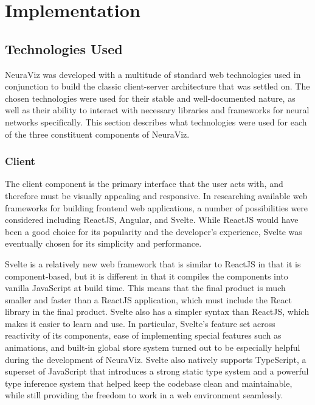 \section{Implementation}
\label{sec:Implementation}

\subsection{Technologies Used}
NeuraViz was developed with a multitude of standard web technologies used in conjunction to build the classic client-server architecture that was settled on. The chosen technologies were used for their stable and well-documented nature, as well as their ability to interact with necessary libraries and frameworks for neural networks specifically.  This section describes what technologies were used for each of the three constituent components of NeuraViz.

\subsubsection{Client}
The client component is the primary interface that the user acts with, and therefore must be visually appealing and responsive. In researching available web frameworks for building frontend web applications, a number of possibilities were considered including ReactJS, Angular, and Svelte. While ReactJS would have been a good choice for its popularity and the developer's experience, Svelte was eventually chosen for its simplicity and performance. 

Svelte \cite{svelte} is a relatively new web framework that is similar to ReactJS in that it is component-based, but it is different in that it compiles the components into vanilla JavaScript at build time. This means that the final product is much smaller and faster than a ReactJS application, which must include the React library in the final product. Svelte also has a simpler syntax than ReactJS, which makes it easier to learn and use. In particular, Svelte's feature set across reactivity of its components, ease of implementing special features such as animations, and built-in global store system turned out to be especially helpful during the development of NeuraViz. Svelte also natively supports TypeScript, a superset of JavaScript that introduces a strong static type system and a powerful type inference system that helped keep the codebase clean and maintainable, while still providing the freedom to work in a web environment seamlessly.

